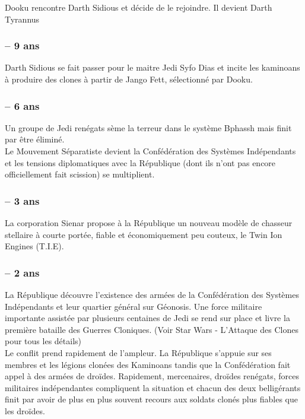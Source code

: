 \documentclass[twoside]{article}
\begin{document}
Dooku rencontre Darth Sidious et décide de le rejoindre. Il devient Darth Tyrannus 

\subsubsection*{-- 9 ans} 
Darth Sidious se fait passer pour le maitre Jedi Syfo Dias et incite les kaminoans à produire des clones à partir de Jango Fett, sélectionné par Dooku.

\subsubsection*{-- 6 ans} 
Un groupe de Jedi renégats sème la terreur dans le système Bphassh mais finit par être éliminé.\\

Le Mouvement Séparatiste devient la Confédération des Systèmes Indépendants et les tensions diplomatiques avec la République (dont ils n'ont pas encore officiellement fait scission) se multiplient.

\subsubsection*{-- 3 ans} 
La corporation Sienar propose à la République un nouveau modèle de chasseur stellaire à courte portée, fiable et économiquement peu couteux, le Twin Ion Engines (T.I.E).

\subsubsection*{-- 2 ans} 
La République découvre l'existence des armées de la Confédération des Systèmes Indépendants et leur quartier général sur Géonosis. Une force militaire importante assistée par plusieurs centaines de Jedi se rend sur place et livre la première bataille des Guerres Cloniques. (Voir Star Wars - L'Attaque des Clones pour tous les détails)\\

Le conflit prend rapidement de l'ampleur. La République s'appuie sur ses membres et les légions clonées des Kaminoans tandis que la Confédération fait appel à des armées de droïdes. Rapidement, mercenaires, droïdes renégats, forces militaires indépendantes compliquent la situation et chacun des deux belligérants finit par avoir de plus en plus souvent recours aux soldats clonés plus fiables que les droïdes. \\
\end{document}
